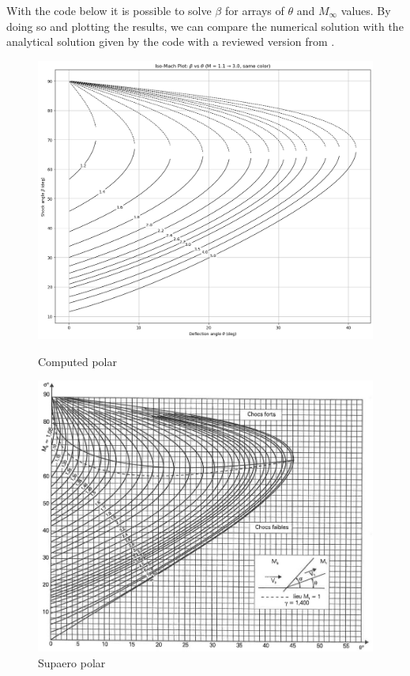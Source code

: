With the code below it is possible to solve $\beta$ for arrays of \(\theta\) and \(M_\infty\) values. By doing so and plotting the results, we can compare the numerical solution with the analytical solution given by the code with a reviewed version from \cite{Tables de Détente ou de Choc by Supaero}. 
\begin{figure}[H]
    \centering
    \begin{minipage}[b]{0.45\linewidth}
        \centering
        \includegraphics[width=\linewidth]{ressources/figures/compute_polaire.png}
		\caption{Computed polar}
    \end{minipage}
    \begin{minipage}[b]{0.45\linewidth}
        \centering
        \includegraphics[width=\linewidth]{ressources/figures/supaero_polar.jpg}
		\caption{Supaero polar}
    \end{minipage}
    \label{fig:polar_comparison}
\end{figure}

